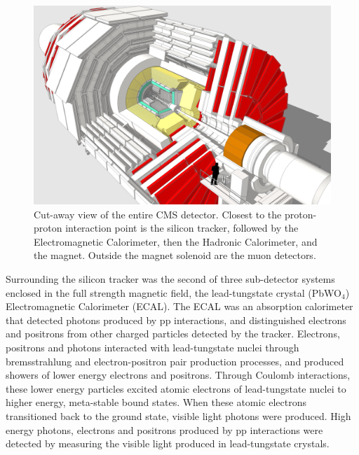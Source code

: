 \begin{figure}[h]
	\centering
	\includegraphics[width=1\textwidth]{figures/cmsDetectorBasic.png}
	\caption{Cut-away view of the entire CMS detector.  Closest to the proton-proton interaction point is the 
		silicon tracker, followed by the Electromagnetic Calorimeter, then the Hadronic Calorimeter, and the 
	magnet.  Outside the magnet solenoid are the muon detectors.}
	\label{fig:layersOfCMS}
\end{figure}


Surrounding the silicon tracker was the second of three sub-detector systems enclosed in the full strength magnetic field, the
lead-tungstate crystal (PbWO$_{4}$) Electromagnetic Calorimeter (ECAL).  The ECAL was an absorption calorimeter that
detected photons produced by pp interactions, and distinguished electrons and positrons from other charged 
particles detected by the tracker.  Electrons, positrons and photons interacted with lead-tungstate nuclei 
through bremsstrahlung and electron-positron pair production processes, and produced showers of lower energy
electrons and positrons.  Through Coulomb interactions, these lower energy particles excited atomic electrons
of lead-tungstate nuclei to higher energy, meta-stable bound states.  When these atomic electrons transitioned
back to the ground state, visible light photons were produced.  High energy photons, electrons and positrons 
produced by pp interactions were detected by measuring the visible light produced in lead-tungstate crystals.

